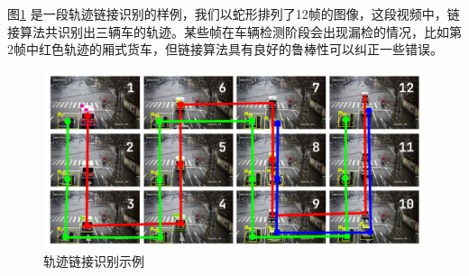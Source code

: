 图\ref{fig:demo} 是一段轨迹链接识别的样例，我们以蛇形排列了12帧的图像，这段视频中，链接算法共识别出三辆车的轨迹。某些帧在车辆检测阶段会出现漏检的情况，比如第2帧中红色轨迹的厢式货车，但链接算法具有良好的鲁棒性可以纠正一些错误。

\begin{figure}[h]
    \centering
    \includegraphics[scale=0.5]{figures/demo}
    \caption{轨迹链接识别示例}
    \label{fig:demo}
\end{figure}
